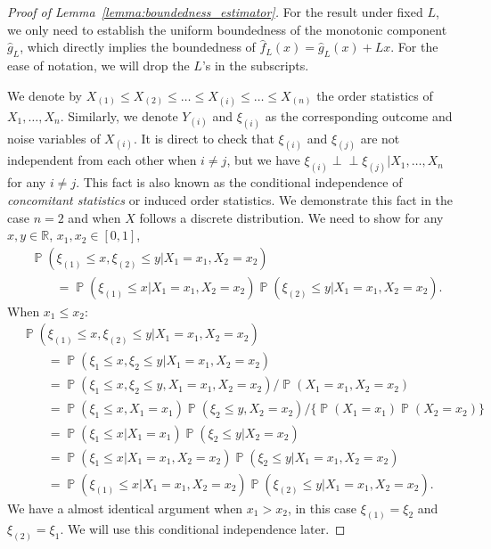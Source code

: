 \documentclass[12pt]{article}
\DeclareMathOperator*{\Prob}{\mathbb{P}}
\begin{document}
\begin{appendices}
\begin{proof}[Proof of Lemma~\ref{lemma:boundedness_estimator}]
For the result under fixed $L$, we only need to establish the uniform boundedness of the monotonic component $\widehat g_{L}$, which directly implies the boundedness of $\widehat f_{L}(x) = \widehat g_{L}(x) + Lx$. For the ease of notation, we will drop the $L$'s in the subscripts. 

We denote by $X_{(1)} \leq X_{(2)} \leq \dots \le X_{(i)} \leq \ldots \leq X_{(n)}$ the order statistics of $X_1,\ldots,X_n$. Similarly, we denote $Y_{(i)}$ and $\xi_{(i)}$ as the corresponding outcome and noise variables of $X_{(i)}$. It is direct to check that $\xi_{(i)}$ and $\xi_{(j)}$ are not independent from each other when $i \neq j$, but we have $\xi_{(i)} \perp \!\!\! \perp \xi_{(j)} | X_1,\ldots,X_n$ for any $i \neq j$. This fact is also known as the conditional independence of \emph{concomitant statistics} or induced order statistics. We demonstrate this fact in the case $n = 2$ and when $X$ follows a discrete distribution. We need to show for any $x,y\in \mathbb{R}$, $x_1,x_2 \in [0,1]$,
\begin{equation}\nonumber
\begin{aligned}
    &\Prob(\xi_{(1)} \leq x, \xi_{(2)} \leq y | X_1 = x_1, X_2 = x_2)\\
    &\qquad = \Prob(\xi_{(1)} \leq x | X_1 = x_1, X_2 = x_2)\Prob(\xi_{(2)} \leq y | X_1 = x_1, X_2 = x_2).
\end{aligned}
\end{equation}
When $x_1 \leq x_2:$
\begin{equation}\nonumber
    \begin{aligned}
     & \Prob(\xi_{(1)} \leq x, \xi_{(2)} \leq y | X_1 = x_1, X_2 = x_2)\\
     & \qquad = \Prob(\xi_{1} \leq x, \xi_{2} \leq y | X_1 = x_1, X_2 = x_2)\\
     & \qquad= \Prob(\xi_{1} \leq x, \xi_{2} \leq y, X_1 = x_1, X_2 = x_2)/\Prob(X_1 = x_1, X_2 = x_2)\\
     & \qquad= \Prob(\xi_{1} \leq x,  X_1 = x_1)\Prob(\xi_{2} \leq y,X_2 = x_2)/\{\Prob(X_1 = x_1)\Prob( X_2 = x_2)\}\\
     & \qquad= \Prob(\xi_{1} \leq x | X_1 = x_1)\Prob(\xi_{2} \leq y | X_2 = x_2)\\
     & \qquad= \Prob(\xi_{1} \leq x | X_1 = x_1 , X_2 = x_2)\Prob(\xi_{2} \leq y | X_1 = x_1, X_2 = x_2)\\
     & \qquad= \Prob(\xi_{(1)} \leq x | X_1 = x_1 , X_2 = x_2)\Prob(\xi_{(2)} \leq y | X_1 = x_1, X_2 = x_2).
    \end{aligned}
\end{equation}
We have a almost identical argument when $x_1 > x_2$, in this case $\xi_{(1)} = \xi_2$ and $\xi_{(2)} = \xi_1$. We will use this conditional independence later.


\end{proof}
\end{appendices}
\end{document}
